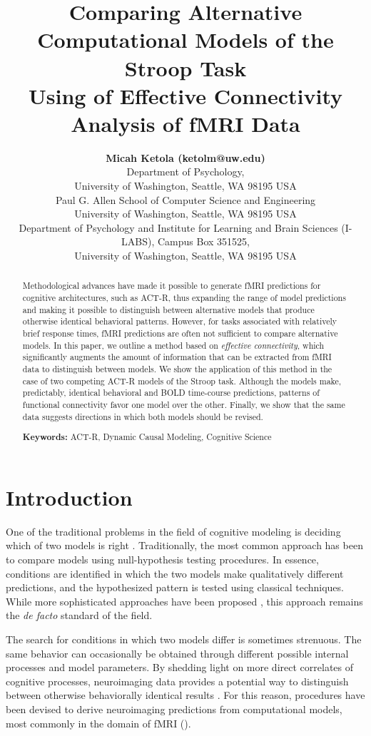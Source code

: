 \documentclass[10pt,letterpaper]{article}
\title{Comparing Alternative Computational Models of the Stroop Task \\Using of Effective Connectivity Analysis of fMRI Data}
\author{{\large \bf Micah Ketola (ketolm@uw.edu)} \\
  Department of Psychology, \\
  University of Washington, Seattle, WA 98195 USA
  \AND {\large \bf Linxing Preston Jiang (prestonj@cs.washington.edu)} \\
  Paul G. Allen School of Computer Science and Engineering\\
  University of Washington, Seattle, WA 98195 USA 
  \AND {\large \bf Andrea Stocco (stocco@uw.edu)} \\
  Department of Psychology and Institute for Learning and Brain Sciences (I-LABS), Campus Box 351525, \\
  University of Washington, Seattle, WA 98195 USA}
\begin{document}
\maketitle


\begin{abstract}
Methodological advances have made it possible to generate fMRI predictions for cognitive architectures, such as ACT-R, thus expanding the range of model predictions and making it possible to distinguish between alternative models that produce otherwise identical behavioral patterns. However, for tasks associated with relatively brief response times, fMRI predictions are often not sufficient to compare alternative models. In this paper, we outline a method based on {\it effective connectivity}, which significantly augments the amount of information that can be extracted from fMRI data to distinguish between models. We show the application of this method in the case of two competing ACT-R models of the Stroop task. Although the models make, predictably, identical behavioral and BOLD time-course predictions, patterns of functional connectivity favor one model over the other. Finally, we show that the same data suggests directions in which both models should be revised.

\textbf{Keywords:} 
ACT-R, Dynamic Causal Modeling, Cognitive Science
\end{abstract}

\section{Introduction}

One of the traditional problems in the field of cognitive modeling is deciding which of two models is right \cite{Pitt2006}. Traditionally, the most common approach has been to compare models using null-hypothesis testing procedures. In essence, conditions are identified in which the two models make qualitatively different predictions, and the hypothesized pattern is tested using classical techniques. While more sophisticated approaches have been proposed \cite{Pitt2006, Veksler2015}, this approach remains the {\it de facto} standard of the field.

The search for conditions in which two models differ is sometimes strenuous. The same behavior can occasionally be obtained through different possible internal processes and model parameters. By shedding light on more direct correlates of cognitive processes, neuroimaging data provides a potential way to distinguish between otherwise behaviorally identical results \cite{Sohn2004}. For this reason, procedures have been devised to derive neuroimaging predictions from computational models, most commonly in the domain of fMRI (\cite{Anderson2008}).
\end{document}
